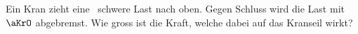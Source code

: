 Ein Kran zieht eine \mKrO\ schwere Last nach oben. Gegen Schluss wird die Last mit $\aKrO$ abgebremst. Wie gross ist die Kraft, welche dabei auf das Kranseil wirkt?
